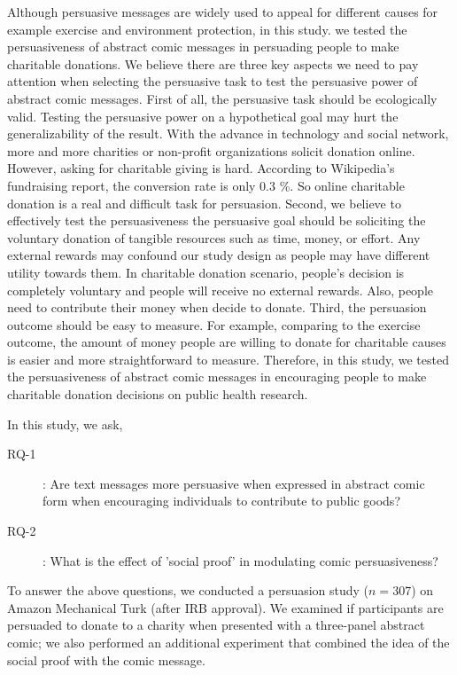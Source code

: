 Although persuasive messages are widely used to appeal for different causes for example exercise and environment protection, in this study. we tested the persuasiveness of abstract comic messages in persuading people to make charitable donations. We believe there are three key aspects we need to pay attention when selecting the persuasive task to test the persuasive power of abstract comic messages. First of all, the persuasive task should be ecologically valid. Testing the persuasive power on a hypothetical goal may hurt the generalizability of the result. With the advance in technology and social network, more and more charities or non-profit organizations solicit donation online. However, asking for charitable giving is hard. According to Wikipedia's fundraising report, the conversion rate is only 0.3 \%. So online charitable donation is a real and difficult task for persuasion. Second, we believe to effectively test the persuasiveness the persuasive goal should be soliciting the voluntary donation of tangible resources such as time, money, or effort. Any external rewards may confound our study design as people may have different utility towards them. In charitable donation scenario, people's decision is completely voluntary and people will receive no external rewards. Also, people need to contribute their money when decide to donate. Third, the persuasion outcome should be easy to measure. For example, comparing to the exercise outcome, the amount of money people are willing to donate for charitable causes is easier and more straightforward to measure. Therefore, in this study, we tested the persuasiveness of abstract comic messages in encouraging people to make charitable donation decisions on public health research. 

In this study, we ask,
\begin{description}
 \item[RQ-1]: Are text messages more persuasive when expressed in abstract comic form when encouraging individuals to contribute to public goods?
 \item[RQ-2]: What is the effect of 'social proof' in modulating comic persuasiveness?
\end{description} 

To answer the above questions, we conducted a persuasion study ($n=307$) on Amazon Mechanical Turk (after IRB approval). We examined if participants are persuaded to donate to a charity when presented with a three-panel abstract comic; we also performed an additional experiment that combined the idea of the social proof with the comic message.


